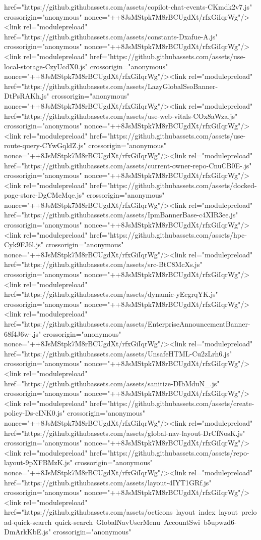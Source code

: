 href="https://github.githubassets.com/assets/copilot-chat-events-CKmdk2v7.js" crossorigin="anonymous" nonce="++8JsMStpk7M8rBCUgdXt/rfxGiIqrWg"/><link rel="modulepreload" href="https://github.githubassets.com/assets/constants-Dxafue-A.js" crossorigin="anonymous" nonce="++8JsMStpk7M8rBCUgdXt/rfxGiIqrWg"/><link rel="modulepreload" href="https://github.githubassets.com/assets/use-local-storage-CzyUcdX0.js" crossorigin="anonymous" nonce="++8JsMStpk7M8rBCUgdXt/rfxGiIqrWg"/><link rel="modulepreload" href="https://github.githubassets.com/assets/LazyGlobalSsoBanner-DtPsRAKh.js" crossorigin="anonymous" nonce="++8JsMStpk7M8rBCUgdXt/rfxGiIqrWg"/><link rel="modulepreload" href="https://github.githubassets.com/assets/use-web-vitals-COx8aWza.js" crossorigin="anonymous" nonce="++8JsMStpk7M8rBCUgdXt/rfxGiIqrWg"/><link rel="modulepreload" href="https://github.githubassets.com/assets/use-route-query-CYwGqldZ.js" crossorigin="anonymous" nonce="++8JsMStpk7M8rBCUgdXt/rfxGiIqrWg"/><link rel="modulepreload" href="https://github.githubassets.com/assets/current-owner-repo-CnuCB0E-.js" crossorigin="anonymous" nonce="++8JsMStpk7M8rBCUgdXt/rfxGiIqrWg"/><link rel="modulepreload" href="https://github.githubassets.com/assets/docked-page-store-DgCMcMqe.js" crossorigin="anonymous" nonce="++8JsMStpk7M8rBCUgdXt/rfxGiIqrWg"/><link rel="modulepreload" href="https://github.githubassets.com/assets/IpmBannerBase-c4XIR3ee.js" crossorigin="anonymous" nonce="++8JsMStpk7M8rBCUgdXt/rfxGiIqrWg"/><link rel="modulepreload" href="https://github.githubassets.com/assets/hpc-Cyk9FJ6l.js" crossorigin="anonymous" nonce="++8JsMStpk7M8rBCUgdXt/rfxGiIqrWg"/><link rel="modulepreload" href="https://github.githubassets.com/assets/src-BtC8McXs.js" crossorigin="anonymous" nonce="++8JsMStpk7M8rBCUgdXt/rfxGiIqrWg"/><link rel="modulepreload" href="https://github.githubassets.com/assets/dynamic-yEcgrqYK.js" crossorigin="anonymous" nonce="++8JsMStpk7M8rBCUgdXt/rfxGiIqrWg"/><link rel="modulepreload" href="https://github.githubassets.com/assets/EnterpriseAnnouncementBanner-68f4J6w-.js" crossorigin="anonymous" nonce="++8JsMStpk7M8rBCUgdXt/rfxGiIqrWg"/><link rel="modulepreload" href="https://github.githubassets.com/assets/UnsafeHTML-Cu2zLrh6.js" crossorigin="anonymous" nonce="++8JsMStpk7M8rBCUgdXt/rfxGiIqrWg"/><link rel="modulepreload" href="https://github.githubassets.com/assets/sanitize-DIbMduN_.js" crossorigin="anonymous" nonce="++8JsMStpk7M8rBCUgdXt/rfxGiIqrWg"/><link rel="modulepreload" href="https://github.githubassets.com/assets/create-policy-Ds-cINK0.js" crossorigin="anonymous" nonce="++8JsMStpk7M8rBCUgdXt/rfxGiIqrWg"/><link rel="modulepreload" href="https://github.githubassets.com/assets/global-nav-layout-DrCfNosK.js" crossorigin="anonymous" nonce="++8JsMStpk7M8rBCUgdXt/rfxGiIqrWg"/><link rel="modulepreload" href="https://github.githubassets.com/assets/repo-layout-9pXFBMzK.js" crossorigin="anonymous" nonce="++8JsMStpk7M8rBCUgdXt/rfxGiIqrWg"/><link rel="modulepreload" href="https://github.githubassets.com/assets/layout-4IYT1GRf.js" crossorigin="anonymous" nonce="++8JsMStpk7M8rBCUgdXt/rfxGiIqrWg"/><link rel="modulepreload" href="https://github.githubassets.com/assets/octicons~layout~index~layout~preload-quick-search~quick-search~GlobalNavUserMenu~AccountSwi~b5upwzd6-DmArkKbE.js" crossorigin="anonymous" 